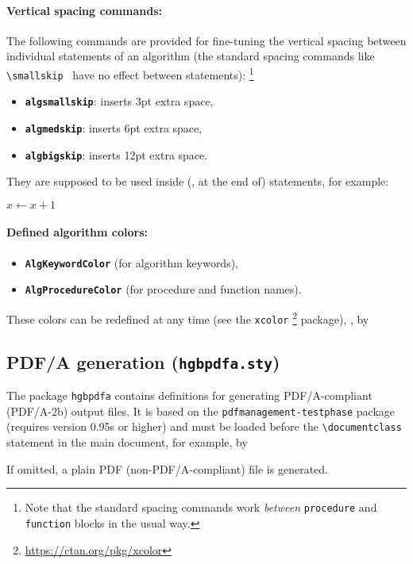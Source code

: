 \documentclass[english]{hgbarticle}
\begin{document}
\paragraph{Vertical spacing commands:}
The following commands are provided for fine-tuning the vertical spacing
between individual statements of an algorithm (the standard spacing commands
like \verb!\smallskip! \etc\ have no effect between statements):%
\footnote{Note that the standard spacing commands work \emph{between}
\texttt{procedure} and \texttt{function} blocks in the usual way.}
\begin{itemize}
    \item \textbf{{\bs}\texttt{algsmallskip}}: inserts 3pt extra space,
    \item \textbf{{\bs}\texttt{algmedskip}}: inserts 6pt extra space,
    \item \textbf{{\bs}\texttt{algbigskip}}: inserts 12pt extra space.
\end{itemize}
They are supposed to be used inside (\ie, at the end of) statements, for
example:
%
\begin{LaTeXCode}[numbers=none]
    \State $x \gets x + 1$ \algsmallskip
\end{LaTeXCode}

\paragraph{Defined algorithm colors:}
\begin{itemize}
    \item \textbf{\texttt{AlgKeywordColor}} (for algorithm keywords),
    \item \textbf{\texttt{AlgProcedureColor}} (for procedure and function
    names).
\end{itemize}
These colors can be redefined at any time (see the \texttt{xcolor}%
\footnote{\url{https://ctan.org/pkg/xcolor}}
package), \eg, by
\begin{LaTeXCode}[numbers=none]
\end{LaTeXCode}


\subsection{PDF/A generation (\texttt{hgbpdfa.sty})}

The package \texttt{hgbpdfa} contains definitions for generating PDF/A-compliant 
(PDF/A-2b) output files. It is based on the \texttt{pdfmanagement-testphase}
package (requires version 0.95s or higher) and must be loaded before the
\verb!\documentclass! statement in the main document, for example, by
\begin{LaTeXCode}[numbers=none]
\RequirePackage{hgbpdfa}
\end{LaTeXCode}
If omitted, a plain PDF (non-PDF/A-compliant) file is generated.
\end{document}
